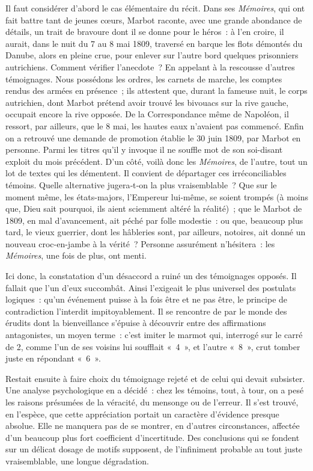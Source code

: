 \documentclass[french,twoside]{book} %
\begin{document}
\noindent Il faut considérer d’abord le cas élémentaire du récit. Dans ses \emph{Mé­moires}, qui ont fait battre tant de jeunes cœurs, Marbot raconte, avec une grande abondance de détails, un trait de bravoure dont il se donne pour le héros : à l’en croire, il aurait, dans le nuit du 7 au 8 mai 1809, traversé en barque les flots démontés du Danube, alors en pleine crue, pour enlever sur l’autre bord quelques prisonniers autrichiens. Comment vérifier l’anecdote ? En appelant à la rescousse d’autres témoignages. Nous possédons les ordres, les carnets de marche, les comptes rendus des armées en présence ; ils attestent que, durant la fameuse nuit, le corps  
\label{p53} autrichien, dont Marbot prétend avoir trouvé les bivouacs sur la rive gauche, occupait encore la rive opposée. De la Correspondance même de Napoléon, il ressort, par ailleurs, que le 8 mai, les hautes eaux n’avaient pas commencé. Enfin on a retrouvé une demande de promotion établie le 30 juin 1809, par Marbot en personne. Parmi les titres qu’il y invoque il ne souffle mot de son soi-disant exploit du mois précédent. D’un côté, voilà donc les \emph{Mémoires}, de l’autre, tout un lot de textes qui les démentent. Il convient de départager ces irréconciliables témoins. Quelle alternative jugera‑t‑on la plus vraisemblable ? Que sur le moment même, les états-­majors, l’Empereur lui-même, se soient trompés (à moins que, Dieu sait pourquoi, ils aient sciemment altéré la réalité) ; que le Marbot de 1809, en mal d’avancement, ait péché par folle modestie : ou que, beaucoup plus tard, le vieux guerrier, dont les hâbleries sont, par ailleurs, notoires, ait donné un nouveau croc-en-jambe à la vérité ? Personne assurément n’hésitera : les \emph{Mémoires}, une fois de plus, ont menti.\par
Ici donc, la constatation d’un désaccord a ruiné un des témoignages opposés. Il fallait que l’un d’eux succombât. Ainsi l’exigeait le plus uni­versel des postulats logiques : qu’un événement puisse à la fois être et ne pas être, le principe de contradiction l’interdit impitoyablement. Il se rencontre de par le monde des érudits dont la bienveillance s’épuise à découvrir entre des affirmations antagonistes, un moyen terme : c’est imiter le marmot qui, interrogé sur le carré de 2, comme l’un de ses voi­sins lui soufflait « 4 », et l’autre « 8 », crut tomber juste en répondant « 6 ».\par
Restait ensuite à faire choix du témoignage rejeté et de celui qui devait subsister. Une analyse psychologique en a décidé : chez les témoins, tout, à tour, on a pesé les raisons présumées de la véracité, du mensonge ou de l’erreur. Il s’est trouvé, en l’espèce, que cette appréciation portait un caractère d’évidence presque absolue. Elle ne manquera pas de se montrer, en d’autres circonstances, affectée d’un beaucoup plus fort coefficient d’incertitude. Des conclusions qui se fondent sur un délicat dosage de motifs supposent, de l’infiniment probable au tout juste vraisemblable, une longue dégradation.\par
\end{document}
